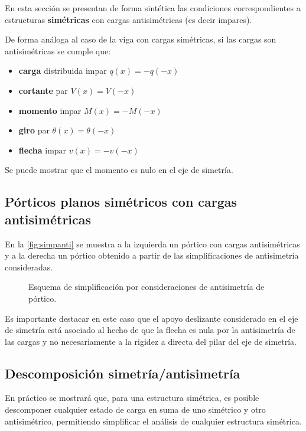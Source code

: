 En esta sección se presentan de forma sintética las condiciones correspondientes a estructuras \textbf{simétricas} con cargas antisimétricas (es decir impares). %

De forma análoga al caso de la viga con cargas simétricas, si las cargas son antisimétricas se cumple que:
%
\begin{itemize}
\item \textbf{carga} distribuida impar $q(x) = -q(-x)$
\item \textbf{cortante} par $V(x) = V(-x)$
\item \textbf{momento} impar $M(x) = -M(-x)$
\item \textbf{giro} par $\theta(x) = \theta(-x)$
\item \textbf{flecha} impar $v(x) = -v(-x)$
\end{itemize}

Se puede mostrar que el momento es nulo en el eje de simetría.

\subsection{Pórticos planos simétricos con cargas antisimétricas}

%
En la \autoref{fig:simpanti} se muestra a la izquierda un pórtico con cargas antisimétricas y a la derecha un pórtico obtenido a partir de las simplificaciones de antisimetría consideradas.
%
\begin{figure}[htb]
	\centering
	\setlength{\unitlength}{0.8\textwidth}
\def\svgwidth{0.8\textwidth}

	\caption{Esquema de simplificación por consideraciones de antisimetría de pórtico.}
	\label{fig:simpanti}
\end{figure}

Es importante destacar en este caso que el apoyo deslizante considerado en el eje de simetría está asociado al hecho de que la flecha es nula por la antisimetría de las cargas y no necesariamente a la rigidez a directa del pilar del eje de simetría.

\subsection{Descomposición simetría/antisimetría}

En práctico se mostrará que, para una estructura simétrica, es posible descomponer cualquier estado de carga en suma de uno simétrico y otro antisimétrico, permitiendo simplificar el análisis de cualquier estructura simétrica.


